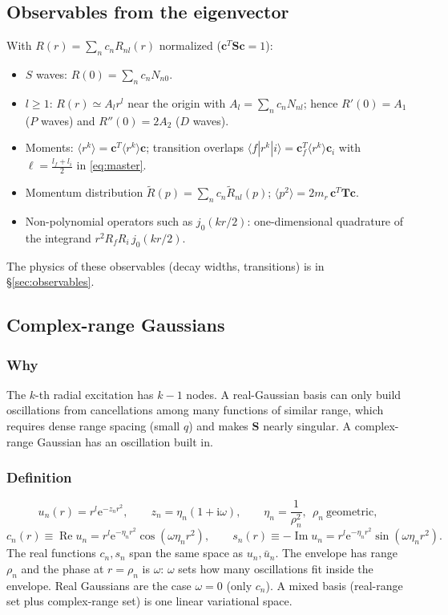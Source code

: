 \documentclass[11pt,a4paper]{article}
\numberwithin{equation}{section}
\theoremstyle{definition}
\theoremstyle{plain}
\theoremstyle{remark}
\numberwithin{algorithm}{section}
\newcommand{\ii}{\mathrm{i}}
\newcommand{\ee}{\mathrm{e}}
\newcommand{\mr}{m_r}
\newcommand{\mS}{\mathbf S}
\newcommand{\vc}{\bm c}
\begin{document}
\subsection{Observables from the eigenvector}\label{sec:obsvec}
With $R(r)=\sum_nc_nR_{nl}(r)$ normalized ($\vc^T\mS\vc=1$):
\begin{itemize}[leftmargin=1.3em,itemsep=2pt]
\item $S$ waves: $R(0)=\sum_nc_nN_{n0}$.
\item $l\ge1$: $R(r)\simeq A_lr^l$ near the origin with $A_l=\sum_nc_nN_{nl}$; hence $R'(0)=A_1$ ($P$ waves) and $R''(0)=2A_2$ ($D$ waves).
\item Moments: $\langle r^k\rangle=\vc^T\langle r^k\rangle\vc$; transition overlaps $\langle f|r^k|i\rangle=\vc_f^T\langle r^k\rangle\vc_i$ with $\ell=\frac{l_f+l_i}2$ in \eqref{eq:master}.
\item Momentum distribution $\tilde R(p)=\sum_nc_n\tilde R_{nl}(p)$; $\langle p^2\rangle=2\mr\,\vc^T\mathbf T\vc$.
\item Non-polynomial operators such as $j_0(kr/2)$: one-dimensional quadrature of the integrand $r^2R_fR_i\,j_0(kr/2)$.
\end{itemize}
The physics of these observables (decay widths, transitions) is in \S\ref{sec:observables}.

\subsection{Complex-range Gaussians}\label{sec:complexrange}
\subsubsection{Why}
The $k$-th radial excitation has $k-1$ nodes. A real-Gaussian basis can only build oscillations from cancellations among many functions of similar range, which requires dense range spacing (small $q$) and makes $\mS$ nearly singular. A complex-range Gaussian has an oscillation built in.

\subsubsection{Definition}
\begin{equation}
u_n(r)=r^l\ee^{-z_nr^2},\qquad z_n=\eta_n(1+\ii\omega),\qquad \eta_n=\frac1{\rho_n^2},\ \ \rho_n\ \text{geometric},
\end{equation}
\begin{equation}
c_n(r)\equiv\operatorname{Re}u_n=r^l\ee^{-\eta_nr^2}\cos(\omega\eta_nr^2),\qquad s_n(r)\equiv-\operatorname{Im}u_n=r^l\ee^{-\eta_nr^2}\sin(\omega\eta_nr^2).
\end{equation}
The real functions $c_n,s_n$ span the same space as $u_n,\bar u_n$. The envelope has range $\rho_n$ and the phase at $r=\rho_n$ is $\omega$: $\omega$ sets how many oscillations fit inside the envelope. Real Gaussians are the case $\omega=0$ (only $c_n$). A mixed basis (real-range set plus complex-range set) is one linear variational space.
\end{document}
